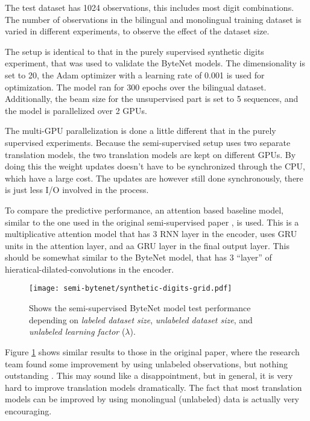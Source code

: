 The test dataset has 1024 observations, this includes most digit combinations. The number of observations in the bilingual and monolingual training dataset is varied in different experiments, to observe the effect of the dataset size.

The setup is identical to that in the purely supervised synthetic digits experiment, that was used to validate the ByteNet models. The dimensionality is set to 20, the Adam optimizer with a learning rate of 0.001 is used for optimization. The model ran for 300 epochs over the bilingual dataset. Additionally, the beam size for the unsupervised part is set to 5 sequences, and the model is parallelized over 2 GPUs.

The multi-GPU parallelization is done a little different that in the purely supervised experiments. Because the semi-supervised setup uses two separate translation models, the two translation models are kept on different GPUs. By doing this the weight updates doesn't have to be synchronized through the CPU, which have a large cost. The updates are however still done synchronously, there is just less I/O involved in the process.

To compare the predictive performance, an attention based baseline model, similar to the one used in the original semi-supervised paper \cite{semi-supervised}, is used. This is a multiplicative attention model \cite{multiplicative-attention} that has 3 RNN layer in the encoder, uses GRU units in the attention layer, and aa GRU layer in the final output layer. This should be somewhat similar to the ByteNet model, that has 3 ``layer'' of hieratical-dilated-convolutions in the encoder.

\begin{figure}[h]
    \centering
    \texttt{[image: semi-bytenet/synthetic-digits-grid.pdf]}
    \caption{Shows the semi-supervised ByteNet model test performance depending on \textit{labeled dataset size}, \textit{unlabeled dataset size}, and \textit{unlabeled learning factor} ($\lambda$).}
     \label{fig:result:semi-bytenet:missrate}
\end{figure}

Figure \ref{fig:result:semi-bytenet:missrate} shows similar results to those in the original paper, where the research team found some improvement by using unlabeled observations, but nothing outstanding \cite{semi-supervised}. This may sound like a disappointment, but in general, it is very hard to improve translation models dramatically. The fact that most translation models can be improved by using monolingual (unlabeled) data is actually very encouraging.

